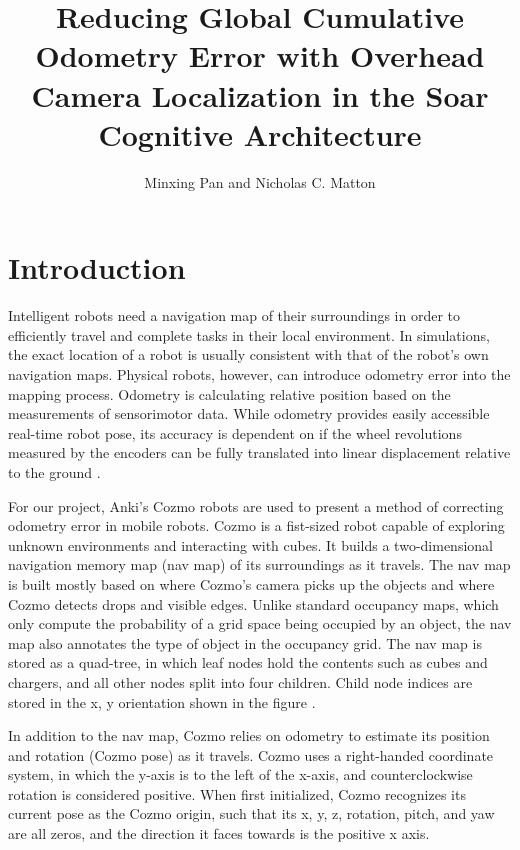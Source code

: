 \documentclass[jou,apacite]{apa6}
\title{Reducing Global Cumulative Odometry Error with Overhead Camera Localization in the Soar Cognitive Architecture}
\author{Minxing Pan and Nicholas C. Matton}
\affiliation{The University of Michigan}
\begin{document}
\maketitle

\section{Introduction}
Intelligent robots need a navigation map of their surroundings in order to efficiently travel and complete tasks in their local environment. In simulations, the exact location of a robot is usually consistent with that of the robot’s own navigation maps. Physical robots, however, can introduce odometry error into the mapping process. Odometry is calculating relative position based on the measurements of sensorimotor data. While odometry provides easily accessible real-time robot pose, its accuracy is dependent on if the wheel revolutions measured by the encoders can be fully translated into linear displacement relative to the ground \cite{Borenstein}.

For our project, Anki’s Cozmo robots are used to present a method of correcting odometry error in mobile robots. Cozmo is a fist-sized robot capable of exploring unknown environments and interacting with cubes. It builds a two-dimensional navigation memory map (nav map) of its surroundings as it travels. The nav map is built mostly based on where Cozmo’s camera picks up the objects and where Cozmo detects drops and visible edges. Unlike standard occupancy maps, which only compute the probability of a grid space being occupied by an object, the nav map also annotates the type of object in the occupancy grid. The nav map is stored as a quad-tree, in which leaf nodes hold the contents such as cubes and chargers, and all other nodes split into four children. Child node indices are stored in the x, y orientation shown in the figure \cite{Anki}.

In addition to the nav map, Cozmo relies on odometry to estimate its position and rotation (Cozmo pose) as it travels. Cozmo uses a right-handed coordinate system, in which the y-axis is to the left of the x-axis, and counterclockwise rotation is considered positive. When first initialized, Cozmo recognizes its current pose as the Cozmo origin, such that its x, y, z, rotation, pitch, and yaw are all zeros, and the direction it faces towards is the positive x axis. 
\end{document}
